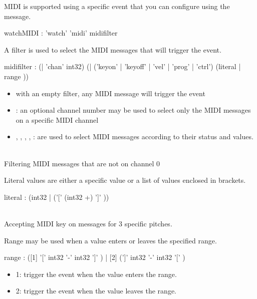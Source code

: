 \documentclass[a4paper,twoside]{article}
\begin{document}
MIDI is supported using a specific event that you can configure using the  message. 

\begin{rail}
watchMIDI : 'watch' 'midi' midifilter
\end{rail}
A filter is used to select the MIDI messages that will trigger the event.

\begin{rail}
midifilter : (| 'chan' int32) 
			 (| ('keyon' | 'keyoff' | 'vel' | 'prog' | 'ctrl') (literal | range ))
\end{rail}

\begin{itemize}
\item with an empty filter, any MIDI message will trigger the event
\item {}: an optional channel number may be used to select only the MIDI messages on a specific MIDI channel
\item {}, , , , : are used to select MIDI messages according to their status and values.
\end{itemize}

\example\\
Filtering MIDI messages that are not on channel 0

Literal values are either a specific value or a list of values enclosed in brackets.

\begin{rail}
literal : (int32 | ('[' (int32 +) ']' ))
\end{rail}

\example\\
Accepting MIDI key on messages for 3 specific pitches.


Range may be used when a value enters or leaves the specified range.

\begin{rail}
range : ([1] '[' int32 '-' int32 ']' )
		| [2] (']' int32 '-' int32 '[' )
\end{rail}

\begin{itemize}
\item 1: trigger the event when the value enters the range. 
\item 2: trigger the event when the value leaves the range.
\end{itemize}
\end{document}
